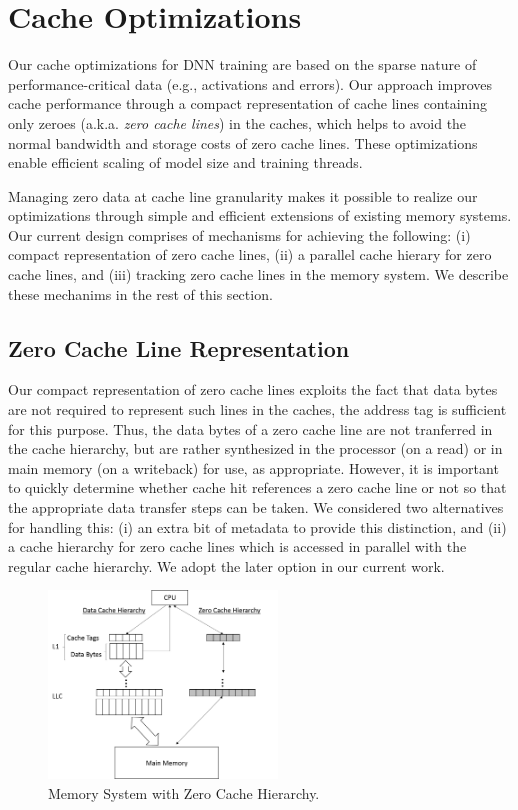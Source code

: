 \section{Cache Optimizations}
\label{sec:cache_opt}

Our cache optimizations for DNN training are based on the sparse nature of performance-critical data (e.g., activations and errors).  Our approach improves cache performance through a compact representation of cache lines containing only zeroes (a.k.a. \emph{zero cache lines}) in the caches, which helps to avoid  the normal bandwidth and storage costs of zero cache lines. These optimizations enable efficient scaling of model size and training threads. 

Managing zero data at cache line granularity makes it possible to realize our optimizations through simple and efficient extensions of existing memory systems.  Our current design comprises of mechanisms for achieving the following: (i) compact representation of zero cache lines, (ii) a parallel cache hierary for zero cache lines, and (iii) tracking zero cache lines in the memory system.  We describe these mechanims in the rest of this section.

\subsection{Zero Cache Line Representation}
Our compact representation of zero cache lines exploits the fact that data bytes are not required to represent such lines in the caches, the address tag is sufficient for this purpose. Thus, the data bytes of a zero cache line are not tranferred in the cache hierarchy, but are rather synthesized in the processor (on a read) or in main memory (on a writeback) for use, as appropriate.  However, it is important to quickly determine whether cache hit references a zero cache line or not so that the appropriate data transfer steps can be taken.  We considered two alternatives for handling this: (i) an extra bit of metadata to provide this distinction, and (ii) a cache hierarchy for zero cache lines which is accessed in parallel with the regular cache hierarchy.  We adopt the later option in our current work. 

\begin{figure}[!t]
\centering
\includegraphics[width=2.4in]{Figures/zero_cache_hierarchy.png}
\caption{Memory System with Zero Cache Hierarchy.}
\label{fig:zero_cache_hierarchy}
\end{figure}

